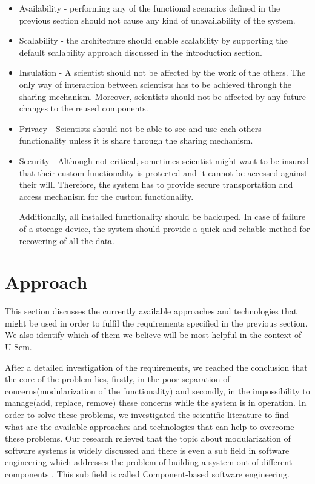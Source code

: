 \begin{itemize}

	\item Availability - performing any of the functional scenarios defined in the previous section should not cause any kind of unavailability of the system. 
	
	\item Scalability - the architecture should enable scalability by supporting the default scalability approach discussed in the introduction section.
	
	\item Insulation - A scientist should not be affected by the work of the others. The only way of interaction between scientists has to be achieved through the sharing mechanism. Moreover, scientists should not be affected by any future changes to the reused components.
	
	\item Privacy - Scientists should not be able to see and use each others functionality unless it is share through the sharing mechanism.
	
	\item Security - Although not critical, sometimes scientist might want to be insured that their custom functionality is protected and it cannot be accessed against their will. Therefore, the system has to provide secure transportation and access mechanism for the custom functionality.
	
Additionally, all installed functionality should be backuped. In case of failure of a storage device, the system should provide a quick and reliable method for recovering of all the data.
	
\end{itemize}

\section{Approach}
\label{sec:approach}

This section discusses the currently available approaches and technologies that might be used in order to fulfil the requirements specified in the previous section. We also identify which of them we believe will be most helpful in the context of U-Sem.

After a detailed investigation of the requirements, we reached the conclusion that the core of the problem lies, firstly, in the poor separation of concerns(modularization of the functionality) and secondly, in the impossibility to manage(add, replace, remove) these concerns while the system is in operation. In order to solve these problems, we investigated the scientific literature to find what are the available approaches and technologies that can help to overcome these problems. Our research relieved that the topic about modularization of software systems is widely discussed and there is even a sub field in software engineering which addresses the problem of building a system out of different components \cite{Jifeng}. This sub field is called Component-based software engineering. 

